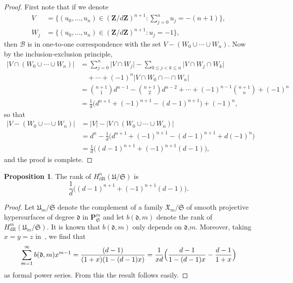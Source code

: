 \documentclass[a4paper,11pt]{article}
\numberwithin{equation}{section}
\providecommand{\abs}[1]{\lvert#1\rvert}                 %
\newcommand{\ZZ}{\mathbf{Z}} %
\providecommand{\HdR}{H_{\text{dR}}}    %
\providecommand{\cB}{\mathcal{B}} %
\theoremstyle{definition}
\newtheorem{prop}[thm]{Proposition}
\begin{document}
\begin{proof}
First note that if we denote
\begin{align*}
V   &= \{(u_0,\dotsc,u_n) \in (\ZZ/d\ZZ)^{n+1} : \sum_{j=0}^n u_j = -(n+1)\}, \\
W_j &= \{(u_0,\dotsc,u_n) \in (\ZZ/d\ZZ)^{n+1} : u_j = -1 \},
\end{align*}
then  $\cB$ is in one-to-one correspondence with the set $V-(W_0 \cup \dotsb \cup W_n)$. 
Now by the inclusion-exclusion principle, 
\begin{align*}
\abs{V \cap (W_0 \cup \dotsb \cup W_n)} 
& = \sum_{j=0}^n \abs{V \cap W_j} 
    - \sum_{0 \leq j < k \leq n} \abs{V \cap W_j \cap W_k} \\
& \quad + \dotsb + (-1)^{n} \abs{V \cap W_0 \cap \dotsb \cap W_n} \\
& = {n+1 \choose 1} d^{n-1} -{n+1 \choose 2} d^{n-2} 
    + \dotsb + (-1)^{n-1} {n+1 \choose n} + (-1)^{n} \\
& = \frac{1}{d} \bigl(d^{n+1}+(-1)^{n+1} - (d-1)^{n+1}\bigr)+(-1)^n,
\end{align*}
so that
\begin{align*}
\abs{V-(W_0 \cup \dotsb \cup W_n)}&=\abs{V}-\abs{V \cap (W_0 \cup \dotsb \cup W_n)} \\
&= d^n - \frac{1}{d} \bigl(d^{n+1}+(-1)^{n+1} - (d-1)^{n+1}+d (-1)^n \bigr) \\
&= \frac{1}{d} \bigl((d-1)^{n+1} + (-1)^{n+1}(d-1) \bigr),
\end{align*}
and the proof is complete.
\end{proof}

\begin{prop} \label{prop:rankcoho}
The rank of $\HdR^n(\mathfrak{U}/\mathfrak{S})$ is
\[
\frac{1}{d} \bigl((d-1)^{n+1} + (-1)^{n+1}(d-1) \bigr).
\]
\end{prop}

\begin{proof}
Let $\mathfrak{U}_m/\mathfrak{S}$ denote the complement of a family
$\mathfrak{X}_m/\mathfrak{S}$ of smooth projective hypersurfaces of 
degree $\mathfrak{d}$ in 
$\mathbf{P}^m_{\mathfrak{S}}$ and let $b(\mathfrak{d},m)$ denote the rank 
of $\HdR^m(\mathfrak{U}_m/\mathfrak{S})$. It is known that 
$b(\mathfrak{d},m)$ only depends on $\mathfrak{d}$,$m$. Moreover, 
taking $x=y=z$ in~\citep[Corollaire 2.4 (i)]{sga7}, we find that
\[
\sum_{m=1}^{\infty} b(\mathfrak{d},m) x^{m-1} = \frac{(d-1)}{(1+x)(1-(d-1)x)} = \frac{1}{xd} \Bigl( \frac{d-1}{1-(d-1)x} - \frac{d-1}{1+x} \Bigr)
\]
as formal power series. From this the result follows easily. 
\end{proof}
\end{document}
